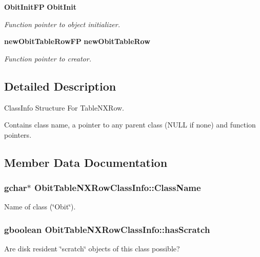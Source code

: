 \begin{CompactItemize}
{\bf Obit\-Init\-FP} {\bf Obit\-Init}
\begin{CompactList}\small\item\em Function pointer to object initializer. \item\end{CompactList}\item 
{\bf new\-Obit\-Table\-Row\-FP} {\bf new\-Obit\-Table\-Row}
\begin{CompactList}\small\item\em Function pointer to creator. \item\end{CompactList}\end{CompactItemize}


\subsection{Detailed Description}
Class\-Info Structure For Table\-NXRow. 

Contains class name, a pointer to any parent class (NULL if none) and function pointers. 



\subsection{Member Data Documentation}
\subsubsection{\setlength{\rightskip}{0pt plus 5cm}gchar$\ast$ {\bf Obit\-Table\-NXRow\-Class\-Info::Class\-Name}}\label{structObitTableNXRowClassInfo_o2}


Name of class (\char`\"{}Obit\char`\"{}). 

\subsubsection{\setlength{\rightskip}{0pt plus 5cm}gboolean {\bf Obit\-Table\-NXRow\-Class\-Info::has\-Scratch}}\label{structObitTableNXRowClassInfo_o1}


Are disk resident \char`\"{}scratch\char`\"{} objects of this class possible? 

